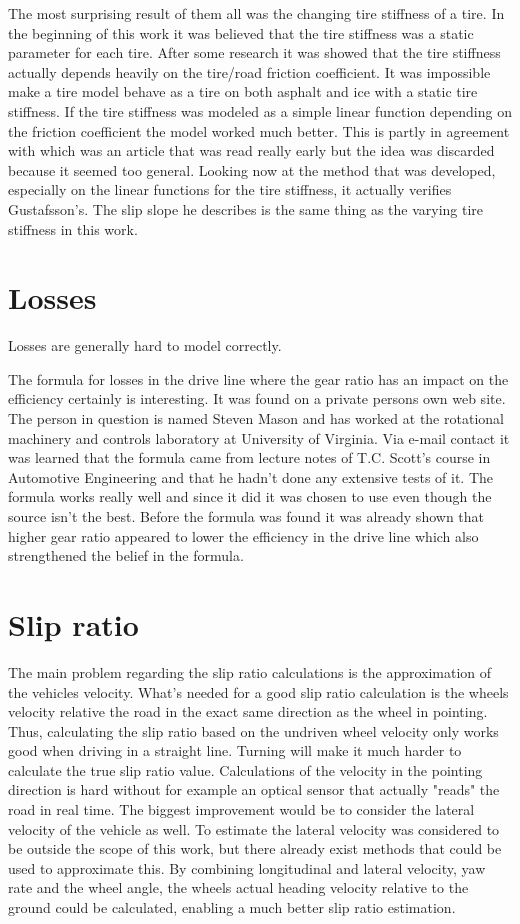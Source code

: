 The most surprising result of them all was the changing tire stiffness of a tire. In the beginning of this work it was believed that the tire stiffness was a static parameter for each tire. After some research it was showed that the tire stiffness actually depends heavily on the tire/road friction coefficient. It was impossible make a tire model behave as a tire on both asphalt and ice with a static tire stiffness. If the tire stiffness was modeled as a simple linear function depending on the friction coefficient the model worked much better. This is partly in agreement with \cite{gustafsson1997} which was an article that was read really early but the idea was discarded because it seemed too general. Looking now at the method that was developed, especially on the linear functions for the tire stiffness, it actually verifies Gustafsson's. The slip slope he describes is the same thing as the varying tire stiffness in this work.


\section{Losses}
Losses are generally hard to model correctly.

The formula for losses in the drive line where the gear ratio has an impact on the efficiency certainly is interesting. It was found on a private persons own web site. The person in question is named Steven Mason and has worked at the rotational machinery and controls laboratory at University of Virginia. Via e-mail contact it was learned that the formula came from lecture notes of T.C. Scott's course in Automotive Engineering and that he hadn't done any extensive tests of it. The formula works really well and since it did it was chosen to use even though the source isn't the best. Before the formula was found it was already shown that higher gear ratio appeared to lower the efficiency in the drive line which also strengthened the belief in the formula. 

\section{Slip ratio}
The main problem regarding the slip ratio calculations is the approximation of the vehicles velocity. What's needed for a good slip ratio calculation is the wheels velocity relative the road in the exact same direction as the wheel in pointing. Thus, calculating the slip ratio based on the undriven wheel velocity only works good when driving in a straight line. Turning will make it much harder to calculate the true slip ratio value. Calculations of the velocity in the pointing direction is hard without for example an optical sensor that actually "reads" the road in real time. The biggest improvement would be to consider the lateral velocity of the vehicle as well. To estimate the lateral velocity was considered to be outside the scope of this work, but there already exist methods that could be used to approximate this. By combining longitudinal and lateral velocity, yaw rate and the wheel angle, the wheels actual heading velocity relative to the ground could be calculated, enabling a much better slip ratio estimation.


